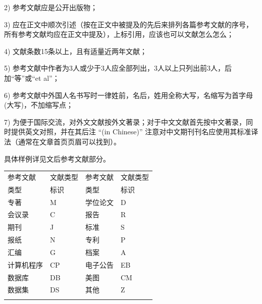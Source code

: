 \documentclass[10.5pt,twocolumn]{aaas}
\begin{document}
2) 参考文献应是公开出版物；

3) 应在正文中顺次引述（按在正文中被提及的先后来排列各篇参考文献的序号，所有参考文献均应在正文中提及），上标引用，应该也可以文献\cite{He2017A}怎么怎么；

4) 文献条数15条以上，且有适量近两年文献；

5) 参考文献中作者为3人或少于3人应全部列出，3人以上只列出前3人，后加``等”或``et al”；

6) 参考文献中外国人名书写时一律姓前，名后，姓用全称大写，名缩写为首字母(大写)，不加缩写点；

7) 为便于国际交流，对外文文献按外文著录；对于中文文献首先按中文著录，同时提供英文对照，并在其后注 ``(in Chinese)” 注意对中文期刊刊名应使用其标准译法（通常在文章首页页眉可以找到）。

具体样例详见文后参考文献部分。

\begin{table}[h!]
  \centering
  \captionnamefont{\xiaowuhao\bf }
  \captiontitlefont{\xiaowuhao\bf }
  \liuhao
  {
    \renewcommand{\arraystretch}{1.3}
    \begin{tabularx}{0.95\linewidth}{Y Y|Y Y}
      \Xhline{1pt}
      {参考文献} & {文献类型} & {参考文献} & {文献类型} \\
      {类型}   & {标识}   & {类型}   & {标识}   \\ \hline
      专著     & M      & 学位论文   & D      \\
      会议录    & C      & 报告     & R      \\
      期刊     & J      & 标准     & S      \\
      报纸     & N      & 专利     & P      \\
      汇编     & G      & 档案     & A      \\
      计算机程序  & CP     & 电子公告   & EB     \\
      数据库    & DB     & 美图     & CM     \\
      数据集    & DS     & 其他     & Z      \\ \Xhline{1pt}
    \end{tabularx}
  }
\end{table}
\end{document}
